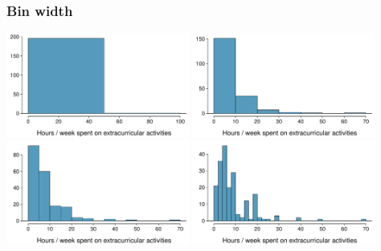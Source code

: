 \begin{frame}
\frametitle{Bin width}


\begin{center}
\includegraphics[width=0.45\textwidth]{1-6_numerical_data/figures/extracurr_hrs_hist/extracurr_hrs_hist2}
\includegraphics[width=0.45\textwidth]{1-6_numerical_data/figures/extracurr_hrs_hist/extracurr_hrs_hist} \\
\includegraphics[width=0.45\textwidth]{1-6_numerical_data/figures/extracurr_hrs_hist/extracurr_hrs_hist20}
\includegraphics[width=0.45\textwidth]{1-6_numerical_data/figures/extracurr_hrs_hist/extracurr_hrs_hist30}
\end{center}

\end{frame}


